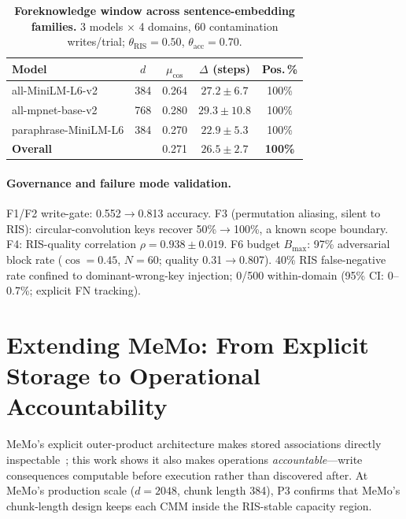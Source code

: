 \documentclass{ceurart}
\newcommand{\RIS}{\mathrm{RIS}}
\begin{document}
\begin{table}[h]
\centering
\caption{\textbf{Foreknowledge window across sentence-embedding families.}
3 models $\times$ 4 domains, 60 contamination writes/trial;
$\theta_{\RIS}{=}0.50$, $\theta_{\mathrm{acc}}{=}0.70$.}
\label{tab:semantic}
\vspace{-2pt}
\small
\begin{tabular}{@{}lcccc@{}}
\toprule
Model & $d$ & $\mu_{\cos}$ & $\Delta$ (steps) & Pos.\,\% \\
\midrule
all-MiniLM-L6-v2      & 384 & 0.264 & $27.2{\pm}6.7$  & 100\% \\
all-mpnet-base-v2     & 768 & 0.280 & $29.3{\pm}10.8$ & 100\% \\
paraphrase-MiniLM-L6  & 384 & 0.270 & $22.9{\pm}5.3$  & 100\% \\
\midrule
\textbf{Overall}      &     & 0.271 & $\mathbf{26.5{\pm}2.7}$ & \textbf{100\%} \\
\bottomrule
\end{tabular}
\end{table}

\paragraph{Governance and failure mode validation.}
F1/F2 write-gate: 0.552$\to$0.813 accuracy.
F3 (permutation aliasing, silent to RIS): circular-convolution keys recover 50\%$\to$100\%, a known scope boundary.
F4: RIS-quality correlation $\rho{=}0.938{\pm}0.019$.
F6 budget $B_{\max}$: 97\% adversarial block rate ($\cos{=}0.45$, $N{=}60$; quality 0.31$\to$0.807).
40\% RIS false-negative rate confined to dominant-wrong-key injection;
0/500 within-domain (95\% CI: 0--0.7\%; explicit FN tracking).

\section{Extending MeMo: From Explicit Storage to Operational Accountability}
\label{sec:memo_governance}

MeMo's explicit outer-product architecture makes stored associations directly
inspectable~\citep{zanzotto2025memo}; this work shows it also makes operations
\emph{accountable}---write consequences computable before execution rather than
discovered after.
At MeMo's production scale ($d{=}2048$, chunk length 384), P3 confirms that
MeMo's chunk-length design keeps each CMM inside the RIS-stable capacity region.
\end{document}
